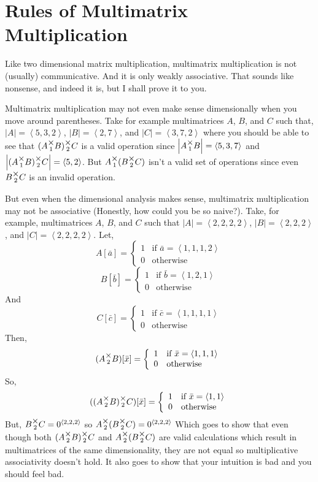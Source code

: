 \documentclass[12pt]{book}
\theoremstyle{plain}
\theoremstyle{definition}
\theoremstyle{ppart}
\theoremstyle{case}
\theoremstyle{solution}
\newcommand{\mmult}[1]{\text{\raisebox{1ex}{$\underset{#1}{\times}$}}}
\newcommand{\shape}[1]{\left|#1\right|}
\begin{document}
\section{Rules of Multimatrix Multiplication}

Like two dimensional matrix multiplication, multimatrix multiplication is
not (usually) communicative. And it is only weakly associative. That sounds like
nonsense, and indeed it is, but I shall prove it to you.

Multimatrix multiplication may not even make sense dimensionally when you move
around parentheses. Take for example multimatrices $A$, $B$, and $C$ such that,
$\shape{A} = \left<5,3,2\right>$,
$\shape{B} = \left<2,7\right>$, and
$\shape{C} = \left<3,7,2\right>$ where you should be able to see that
$(A \mmult{1} B) \mmult{2} C$ is a valid operation since
$\shape{A \mmult{1} B} = \left<5,3,7\right>$ and
$\shape{(A \mmult{1} B) \mmult{2} C} = \left<5,2\right>$. But
$A \mmult{1} (B \mmult{2} C)$ isn't a valid set of operations since even
$B \mmult{2} C$ is an invalid operation.

But even when the dimensional analysis makes sense, multimatrix multiplication
may not be associative (Honestly, how could you be so naive?). 
Take, for example, multimatrices $A$, $B$, and $C$ such
that $\shape{A} = \left<2,2,2,2\right>$, $\shape{B} = \left<2,2,2\right>$, and
$\shape{C} = \left<2,2,2,2\right>$. Let,
\[
 A[\bar{a}] = 
  \left\{
    \begin{array}{ll}
      1 & \mbox{if } \bar{a} = \left<1,1,1,2\right> \\
      0 & \mbox{otherwise}
    \end{array}
  \right.
\]
\[
 B[\bar{b}] = 
  \left\{
    \begin{array}{ll}
      1 & \mbox{if } \bar{b} = \left<1,2,1\right> \\
      0 & \mbox{otherwise}
    \end{array}
  \right.
\]
And
\[
 C[\bar{c}] = 
  \left\{
    \begin{array}{ll}
      1 & \mbox{if } \bar{c} = \left<1,1,1,1\right> \\
      0 & \mbox{otherwise}
    \end{array}
  \right.
\]
Then,
\[
 (A \mmult{2} B)[\bar{x}] = 
  \left\{
    \begin{array}{ll}
      1 & \mbox{if } \bar{x} = \left<1,1,1\right> \\
      0 & \mbox{otherwise}
    \end{array}
  \right.
\]
So,
\[
 ((A \mmult{2} B) \mmult{2} C)[\bar{x}] = 
  \left\{
    \begin{array}{ll}
      1 & \mbox{if } \bar{x} = \left<1,1\right> \\
      0 & \mbox{otherwise}
    \end{array}
  \right.
\]
But, $B \mmult{2} C = 0^{\left<2,2,2\right>}$ so $A \mmult{2} (B \mmult{2} C) = 0^{\left<2,2,2\right>}$
Which goes to show that even though both $(A \mmult{2} B) \mmult{2} C$ and
$A \mmult{2} (B \mmult{2} C)$ are valid calculations which result in multimatrices
of the same dimensionality, they are not equal so multiplicative associativity
doesn't hold. It also goes to show that your intuition is bad and you should feel bad.
\end{document}
